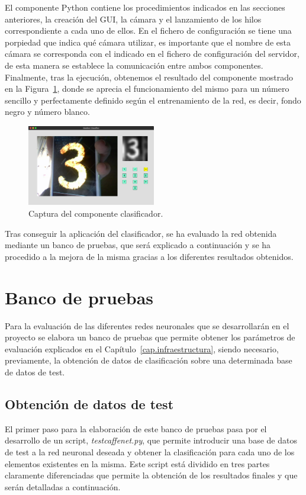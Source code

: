 El componente Python contiene los procedimientos indicados en las secciones anteriores, la creación del GUI, la cámara y el lanzamiento de los hilos correspondiente a cada uno de ellos. En el fichero de configuración se tiene una porpiedad que indica qué cámara utilizar, es importante que el nombre de esta cámara se corresponda con el indicado en el fichero de configuración del servidor, de esta manera se establece la comunicación entre ambos componentes.\\

Finalmente, tras la ejecución, obtenemos el resultado del componente mostrado en la Figura~\ref{fig.componente1}, donde se aprecia el funcionamiento del mismo para un número sencillo y perfectamente definido según el entrenamiento de la red, es decir, fondo negro y número blanco.

\begin{figure}[H]
	\begin{center}
		\includegraphics[width=0.5\textwidth]{figures/componente1}
		\caption{Captura del componente clasificador.}
		\label{fig.componente1}
	\end{center}
\end{figure}

Tras conseguir la aplicación del clasificador, se ha evaluado la red obtenida mediante un banco de pruebas, que será explicado a continuación y se ha procedido a la mejora de la misma gracias a los diferentes resultados obtenidos.

\section{Banco de pruebas} \label{sec.banco}
Para la evaluación de las diferentes redes neuronales que se desarrollarán en el proyecto se elabora un banco de pruebas que permite obtener los parámetros de evaluación explicados en el Capítulo~\ref{cap.infraestructura}, siendo necesario, previamente, la obtención de datos de clasificación sobre una determinada base de datos de test.

\subsection{Obtención de datos de test}
El primer paso para la elaboración de este banco de pruebas pasa por el desarrollo de un script, \textit{testcaffenet.py}, que permite introducir una base de datos de test a la red neuronal deseada y obtener la clasificación para cada uno de los elementos existentes en la misma. Este script está dividido en tres partes claramente diferenciadas que permite la obtención de los resultados finales y que serán detalladas a continuación.

